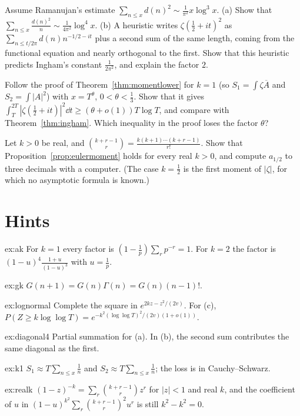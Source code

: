 \begin{exercise}[$\star\star$]\label{ex:diagonal4}
Assume Ramanujan's estimate $\sum_{n\le x}d(n)^2\sim\frac1{\pi^2}x\log^3x$. (a) Show that $\sum_{n\le x}\frac{d(n)^2}n\sim\frac1{4\pi^2}\log^4x$. (b) A heuristic writes $\zeta(\frac12+it)^2$ as $\sum_{n\le t/2\pi}d(n)n^{-1/2-it}$ plus a second sum of the same length, coming from the functional equation and nearly orthogonal to the first. Show that this heuristic predicts Ingham's constant $\frac1{2\pi^2}$, and explain the factor $2$.
\end{exercise}

\begin{exercise}[$\star$]\label{ex:k1}
Follow the proof of Theorem~\ref{thm:momentlower} for $k=1$ (so $S_1=\int\zeta\overline A$ and $S_2=\int|A|^2$) with $x=T^\theta$, $0<\theta<\frac13$. Show that it gives $\int_T^{2T}|\zeta(\frac12+it)|^2\dd t\ge(\theta+o(1))T\log T$, and compare with Theorem~\ref{thm:ingham}. Which inequality in the proof loses the factor $\theta$?
\end{exercise}

\begin{exercise}[$\star\star\star$]\label{ex:realk}
Let $k>0$ be real, and $\binom{k+r-1}r=\frac{k(k+1)\cdots(k+r-1)}{r!}$. Show that Proposition~\ref{prop:eulermoment} holds for every real $k>0$, and compute $a_{1/2}$ to three decimals with a computer. (The case $k=\frac12$ is the first moment of $|\zeta|$, for which no asymptotic formula is known.)
\end{exercise}

\section{Hints}

\begin{hint}{ex:ak}
For $k=1$ every factor is $(1-\frac1p)\sum_rp^{-r}=1$. For $k=2$ the factor is $(1-u)^4\frac{1+u}{(1-u)^3}$ with $u=\frac1p$.
\end{hint}
\begin{hint}{ex:gk}
$G(n+1)=G(n)\Gamma(n)=G(n)(n-1)!$.
\end{hint}
\begin{hint}{ex:lognormal}
Complete the square in $e^{2kz-z^2/(2v)}$. For (c), $P(Z\ge k\log\log T)=e^{-k^2(\log\log T)^2/(2v)(1+o(1))}$.
\end{hint}
\begin{hint}{ex:diagonal4}
Partial summation for (a). In (b), the second sum contributes the same diagonal as the first.
\end{hint}
\begin{hint}{ex:k1}
$S_1\approx T\sum_{n\le x}\frac1n$ and $S_2\approx T\sum_{n\le x}\frac1n$; the loss is in Cauchy--Schwarz.
\end{hint}
\begin{hint}{ex:realk}
$(1-z)^{-k}=\sum_r\binom{k+r-1}rz^r$ for $|z|<1$ and real $k$, and the coefficient of $u$ in $(1-u)^{k^2}\sum_r\binom{k+r-1}r^2u^r$ is still $k^2-k^2=0$.
\end{hint}


